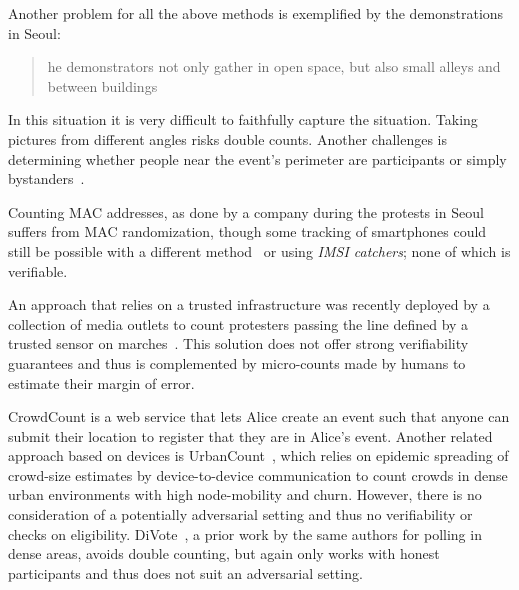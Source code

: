 Another problem for all the above methods is exemplified by the demonstrations in Seoul:
\blockcquote{2016DemonstrationsInSeoul}{%
  he demonstrators not only gather in open space, but also small alleys and between buildings%
}.
In this situation it is very difficult to faithfully capture the situation.
Taking pictures from different angles risks double counts. Another challenges is determining whether people near the event's perimeter are participants or simply bystanders~\cite{HowToEstimateCrowdSize}.

Counting MAC addresses, as done by a company during the protests in Seoul~\cite{2016DemonstrationsInSeoul} suffers from MAC randomization, though some tracking of smartphones could still be possible with a different method~\cite{WhyMACRandomizationIsNotEnough} or using \emph{IMSI catchers}; none of which is verifiable.

An approach that relies on a trusted infrastructure was recently deployed by a collection of media outlets to count protesters passing the line defined by a trusted sensor on marches~\cite{LeMondeProtestingSolution}. 
This solution does not offer strong verifiability guarantees and thus is complemented by micro-counts made by humans to estimate their margin of error.

CrowdCount \citet{CrowdCount} is a web service that lets Alice create an event such that anyone can submit their location to register that they are in Alice's event.
Another related approach based on devices is UrbanCount~\cite{UrbanCount}, which relies on epidemic spreading of crowd-size estimates by device-to-device communication to count crowds in dense urban environments with high node-mobility and churn.
However, there is no consideration of a potentially adversarial setting and thus no verifiability or checks on eligibility.  DiVote~\cite{DiVote}, a prior work by the same authors for polling in dense areas, avoids double counting, but again only works with honest participants and thus does not suit an adversarial setting.

